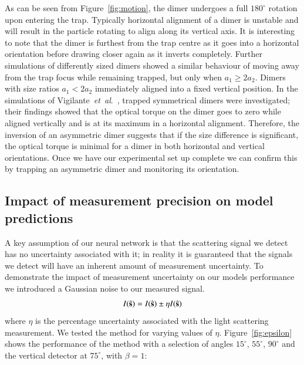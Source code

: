\documentclass[final,  3p]{elsarticle}
\begin{document}
As can be seen from Figure~\ref{fig:motion}, the dimer undergoes a full $180^{\circ}$ rotation upon entering the trap.  Typically horizontal alignment of a dimer is unstable and will result in the particle rotating to align along its vertical axis.  It is interesting to note that the dimer is furthest from the trap centre as it goes into a horizontal orientation before drawing closer again as it inverts completely. Further simulations of differently sized dimers showed a similar behaviour of moving away from the trap focus while remaining trapped, but only when $a_1 \geq 2a_2$.  Dimers with size ratios $a_1 < 2a_2$ immediately aligned into a fixed vertical position.
%
In the simulations of Vigilante~\emph{et~al}.\
\cite{Vigilante2020Brownian_OT}, trapped symmetrical dimers were
investigated; their findings showed that the optical torque on the
dimer goes to zero while aligned vertically and is at its maximum in a
horizontal alignment. Therefore, the inversion of an asymmetric dimer
suggests that if the size difference is significant, the optical
torque is minimal for a dimer in both horizontal and vertical
orientations. Once we have our experimental set up complete we can
confirm this by trapping an asymmetric dimer and monitoring its
orientation.


\subsection{Impact of measurement precision on model predictions}
\label{sec:epsilon}

A key assumption of our neural network is that the scattering signal we detect has no uncertainty associated with it; in reality it is guaranteed that the signals we detect will have an inherent amount of measurement uncertainty. To demonstrate the impact of measurement uncertainty on our models performance we introduced a Gaussian noise to our measured signal.
\begin{align}
	I(\hat{\bf s}) = I(\hat{\bf s}) \pm \eta I(\hat{\bf s})
\end{align}
where $\eta$ is the percentage uncertainty associated with the light
scattering measurement.  We tested the method for varying values of
$\eta$.  Figure~\ref{fig:epsilon} shows the performance of the method
with a selection of angles $15^{\circ}$, $55^{\circ}$, $90^{\circ}$
and the vertical detector at $75^{\circ}$, with $\beta=1$:
\end{document}
